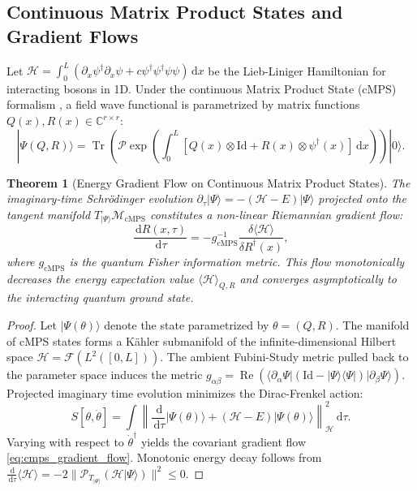 \documentclass[11pt,a4paper,reqno]{amsart}
\newtheorem{theorem}{Theorem}[section]
\theoremstyle{definition}
\numberwithin{equation}{section}
\newcommand{\C}{\mathbb{C}}
\newcommand{\Id}{\mathrm{Id}}
\newcommand{\Tr}{\operatorname{Tr}}
\newcommand{\dif}{\,\mathrm{d}}
\begin{document}
\subsection{Continuous Matrix Product States and Gradient Flows}
Let $\mathcal{H} = \int_0^L (\partial_x \psi^\dagger \partial_x \psi + c \psi^\dagger \psi^\dagger \psi \psi) \dif x$ be the Lieb-Liniger Hamiltonian for interacting bosons in 1D. Under the continuous Matrix Product State (cMPS) formalism \cite{verstraete2010continuous}, a field wave functional is parametrized by matrix functions $Q(x), R(x) \in \C^{r \times r}$:
\begin{equation}
    \label{eq:cmps_state}
    |\Psi(Q, R)\rangle = \Tr\left( \mathcal{P} \exp\left( \int_0^L [Q(x) \otimes \Id + R(x) \otimes \psi^\dagger(x)] \dif x \right) \right) |0\rangle.
\end{equation}

\begin{theorem}[Energy Gradient Flow on Continuous Matrix Product States]
\label{thm:cmps_energy_flow}
The imaginary-time Schr\"odinger evolution $\partial_\tau |\Psi\rangle = -(\mathcal{H} - E) |\Psi\rangle$ projected onto the tangent manifold $T_{|\Psi\rangle}\mathcal{M}_{\mathrm{cMPS}}$ constitutes a non-linear Riemannian gradient flow:
\begin{equation}
    \label{eq:cmps_gradient_flow}
    \frac{\dif R(x, \tau)}{\dif \tau} = -g_{\mathrm{cMPS}}^{-1} \frac{\delta \langle \mathcal{H} \rangle}{\delta R^\dagger(x)},
\end{equation}
where $g_{\mathrm{cMPS}}$ is the quantum Fisher information metric. This flow monotonically decreases the energy expectation value $\langle \mathcal{H} \rangle_{Q, R}$ and converges asymptotically to the interacting quantum ground state.
\end{theorem}
\begin{proof}
Let $|\Psi(\theta)\rangle$ denote the state parametrized by $\theta = (Q, R)$. The manifold of cMPS states forms a K\"ahler submanifold of the infinite-dimensional Hilbert space $\mathscr{H} = \mathcal{F}(L^2([0, L]))$. The ambient Fubini-Study metric pulled back to the parameter space induces the metric $g_{\alpha \beta} = \operatorname{Re}\left( \langle \partial_\alpha \Psi | (\Id - |\Psi\rangle \langle \Psi|) | \partial_\beta \Psi \rangle \right)$. Projected imaginary time evolution minimizes the Dirac-Frenkel action:
\begin{equation}
    S[\theta, \dot{\theta}] = \int \left\| \frac{\dif}{\dif \tau} |\Psi(\theta)\rangle + (\mathcal{H} - E) |\Psi(\theta)\rangle \right\|_{\mathscr{H}}^2 \dif \tau.
\end{equation}
Varying with respect to $\dot{\theta}^\dagger$ yields the covariant gradient flow \eqref{eq:cmps_gradient_flow}. Monotonic energy decay follows from $\frac{\dif}{\dif \tau}\langle \mathcal{H} \rangle = -2 \| \mathcal{P}_{T_{|\Psi\rangle}}(\mathcal{H} |\Psi\rangle) \|^2 \le 0$.
\end{proof}
\end{document}
